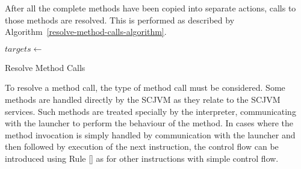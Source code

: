 After all the complete methods have been copied into separate actions,
calls to those methods are resolved.
This is performed as described by
Algorithm~\ref{resolve-method-calls-algorithm}.
\begin{algorithm}
  \begin{algorithmic}[1]
    \State $targets \gets$ 
    \State {}
    \Else
    \State {}
    \EndIf
    \EndFor
    \EndFor
    \EndProcedure
  \end{algorithmic}
  \caption{Resolve Method Calls}
  \label{resolve-method-calls-algorithm}
\end{algorithm}



To resolve a method call, the type of method call must be considered.
Some methods are handled directly by the SCJVM as they relate to the
SCJVM services.
Such methods are treated specially by the interpreter, communicating
with the launcher to perform the behaviour of the method.
In cases where the method invocation is simply handled by
communication with the launcher and then followed by execution of the
next instruction, the control flow can be introduced using
Rule [] as for other instructions with
simple control flow.


